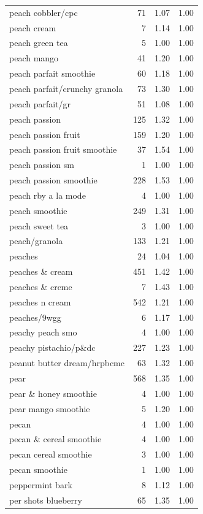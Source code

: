 \begin{table}
\begin{tabular}{lrrr}
peach cobbler/cpc & 71 & 1.07 & 1.00 \\
peach cream & 7 & 1.14 & 1.00 \\
peach green tea & 5 & 1.00 & 1.00 \\
peach mango & 41 & 1.20 & 1.00 \\
peach parfait smoothie & 60 & 1.18 & 1.00 \\
peach parfait/crunchy granola & 73 & 1.30 & 1.00 \\
peach parfait/gr & 51 & 1.08 & 1.00 \\
peach passion & 125 & 1.32 & 1.00 \\
peach passion fruit & 159 & 1.20 & 1.00 \\
peach passion fruit smoothie & 37 & 1.54 & 1.00 \\
peach passion sm & 1 & 1.00 & 1.00 \\
peach passion smoothie & 228 & 1.53 & 1.00 \\
peach rby a la mode & 4 & 1.00 & 1.00 \\
peach smoothie & 249 & 1.31 & 1.00 \\
peach sweet tea & 3 & 1.00 & 1.00 \\
peach/granola & 133 & 1.21 & 1.00 \\
peaches & 24 & 1.04 & 1.00 \\
peaches \& cream & 451 & 1.42 & 1.00 \\
peaches \& creme & 7 & 1.43 & 1.00 \\
peaches n cream & 542 & 1.21 & 1.00 \\
peaches/9wgg & 6 & 1.17 & 1.00 \\
peachy peach smo & 4 & 1.00 & 1.00 \\
peachy pistachio/p\&dc & 227 & 1.23 & 1.00 \\
peanut butter dream/hrpbcmc & 63 & 1.32 & 1.00 \\
pear & 568 & 1.35 & 1.00 \\
pear \& honey smoothie & 4 & 1.00 & 1.00 \\
pear mango smoothie & 5 & 1.20 & 1.00 \\
pecan & 4 & 1.00 & 1.00 \\
pecan \& cereal smoothie & 4 & 1.00 & 1.00 \\
pecan cereal smoothie & 3 & 1.00 & 1.00 \\
pecan smoothie & 1 & 1.00 & 1.00 \\
peppermint bark & 8 & 1.12 & 1.00 \\
per shots blueberry & 65 & 1.35 & 1.00 \\

\end{tabular}
\end{table}
